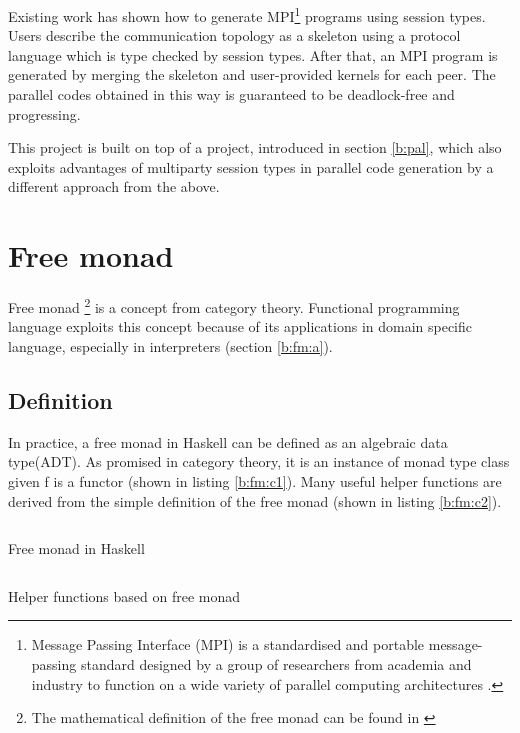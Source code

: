 Existing work\cite{ngSafeMPICode} has shown how to generate MPI\footnote{Message Passing Interface (MPI) is a standardised and portable message-passing standard designed by a group of researchers from academia and industry to function on a wide variety of parallel computing architectures \cite{MessagePassingInterface2018}.} programs using session types. Users describe the communication topology as a skeleton using a protocol language which is type checked by session types. After that, an MPI program is generated by merging the skeleton and user-provided kernels for each peer. The parallel codes obtained in this way is guaranteed to be deadlock-free and progressing. 

This project is built on top of a project, introduced in section \ref{b:pal}, which also exploits advantages of multiparty session types in parallel code generation by a different approach from the above.
\section{Free monad} \label{b:fm}
Free monad \footnote{The mathematical definition of the free monad can be found in \cite{contributorsCatsFreeMonads}} is a concept from category theory.
Functional programming language exploits this concept because of its applications in domain specific language, especially in interpreters (section \ref{b:fm:a}).
\subsection{Definition}
In practice, a free monad in Haskell can be defined as an algebraic data type(ADT). As promised in category theory, it is an instance of monad type class given f is a functor (shown in listing \ref{b:fm:c1}). Many useful helper functions are derived from the simple definition of the free monad (shown in listing \ref{b:fm:c2}).
\begin{listing}[ht]
  \inputminted{haskell}{background/fm-construction.hs}
  \caption{Free monad in Haskell}
  \label{b:fm:c1}
\end{listing}
\begin{listing}[ht]
  \inputminted{haskell}{background/fm-helper.hs}
  \caption{Helper functions based on free monad}
  \label{b:fm:c2}
\end{listing}
